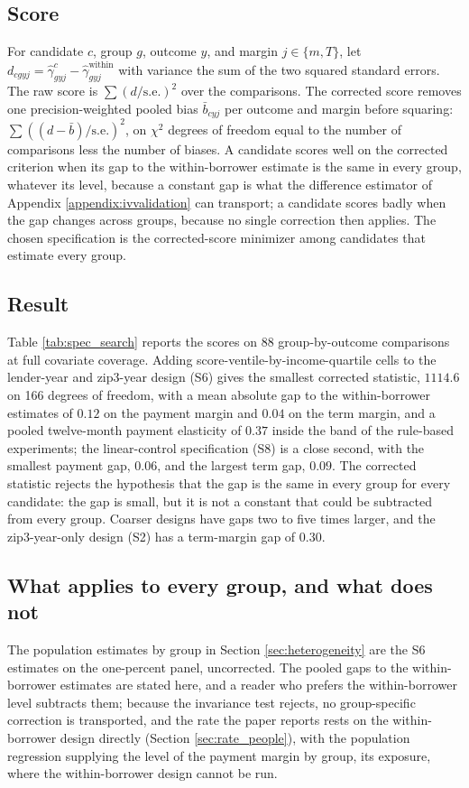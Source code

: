 \subsection{Score}
For candidate $c$, group $g$, outcome $y$, and margin $j \in \{m, T\}$, let $d_{cgyj} = \hat\gamma^{c}_{gyj} - \hat\gamma^{\text{within}}_{gyj}$ with variance the sum of the two squared standard errors. The raw score is $\sum (d/\text{s.e.})^2$ over the comparisons. The corrected score removes one precision-weighted pooled bias $\bar b_{cyj}$ per outcome and margin before squaring: $\sum ((d - \bar b)/\text{s.e.})^2$, on $\chi^2$ degrees of freedom equal to the number of comparisons less the number of biases. A candidate scores well on the corrected criterion when its gap to the within-borrower estimate is the same in every group, whatever its level, because a constant gap is what the difference estimator of Appendix \ref{appendix:ivvalidation} can transport; a candidate scores badly when the gap changes across groups, because no single correction then applies. The chosen specification is the corrected-score minimizer among candidates that estimate every group.

\subsection{Result}
Table \ref{tab:spec_search} reports the scores on 88 group-by-outcome comparisons at full covariate coverage. Adding score-ventile-by-income-quartile cells to the lender-year and zip3-year design (S6) gives the smallest corrected statistic, $1114.6$ on 166 degrees of freedom, with a mean absolute gap to the within-borrower estimates of $0.12$ on the payment margin and $0.04$ on the term margin, and a pooled twelve-month payment elasticity of $0.37$ inside the band of the rule-based experiments; the linear-control specification (S8) is a close second, with the smallest payment gap, $0.06$, and the largest term gap, $0.09$. The corrected statistic rejects the hypothesis that the gap is the same in every group for every candidate: the gap is small, but it is not a constant that could be subtracted from every group. Coarser designs have gaps two to five times larger, and the zip3-year-only design (S2) has a term-margin gap of $0.30$.

\subsection{What applies to every group, and what does not}
The population estimates by group in Section \ref{sec:heterogeneity} are the S6 estimates on the one-percent panel, uncorrected. The pooled gaps to the within-borrower estimates are stated here, and a reader who prefers the within-borrower level subtracts them; because the invariance test rejects, no group-specific correction is transported, and the rate the paper reports rests on the within-borrower design directly (Section \ref{sec:rate_people}), with the population regression supplying the level of the payment margin by group, its exposure, where the within-borrower design cannot be run.

